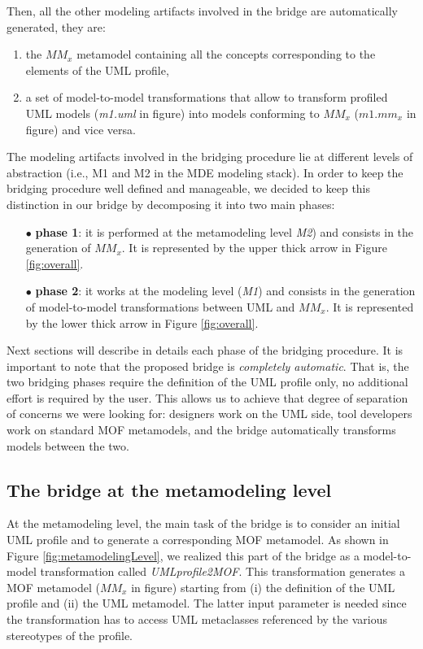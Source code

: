 Then, all the other modeling artifacts involved in the bridge are automatically generated, they are:
\begin{enumerate}
	\item the $MM_x$ metamodel containing all the concepts corresponding to the elements of the UML profile,
	\item a set of model-to-model transformations that allow to transform profiled UML models (\textit{m1.uml} in figure) into models
conforming to $MM_x$ ($m1.mm_x$ in figure) and vice versa.
\end{enumerate}
%
The modeling artifacts involved in the bridging procedure lie at different levels of abstraction  
(i.e., M1 and M2 in the MDE modeling stack). In order to keep the bridging procedure well defined and manageable,
we decided to keep this distinction in our bridge by decomposing it into two main phases: 
%
\begin{itemize}
	\item[$\bullet$] \textbf{phase 1}: it is performed at the metamodeling level \textit{M2}) and consists in the generation of $MM_x$.
	It is represented by the upper thick arrow in Figure \ref{fig:overall}. 
	\item[$\bullet$] \textbf{phase 2}: it works at the modeling level (\textit{M1}) and consists in the generation of model-to-model 
	transformations between UML and $MM_x$. It is represented by the lower thick arrow in Figure \ref{fig:overall}.
\end{itemize}
%
Next sections will describe in details each phase of the bridging procedure.
It is important to note that the proposed bridge is \textit{completely automatic}. That is, the two bridging phases require 
the definition of the UML profile only, no additional effort is required by the user. This allows us to achieve
that degree of separation of concerns we were looking for: designers work on the UML side, tool developers work on standard MOF metamodels,
and the bridge automatically transforms models between the two.


\subsection{The bridge at the metamodeling level}\label{sec:metamodelLevel}
At the metamodeling level, the main task of the bridge is to consider an initial UML profile and to generate a corresponding MOF metamodel.
As shown in Figure \ref{fig:metamodelingLevel}, we realized this part of the bridge as a model-to-model transformation called 
\textit{UMLprofile2MOF}. This transformation generates a MOF metamodel ($MM_x$ in figure) starting from (i) the definition of the UML profile and (ii) the UML metamodel. The latter input parameter is needed since the transformation has to access UML metaclasses referenced by the 
various stereotypes of the profile.

